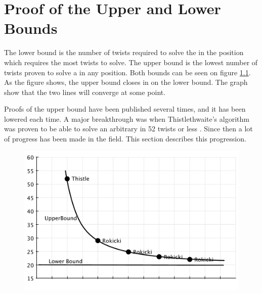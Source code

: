\chapter{Proof of the Upper and Lower Bounds}

The lower bound is the number of twists required to solve the \rubik{} in the position which requires the most twists to solve.
The upper bound is the lowest number of twists proven to solve a \rubik{} in any position.
Both bounds can be seen on figure \ref{fig:upperLowerBound}.
As the figure shows, the upper bound closes in on the lower bound.
The graph show that the two lines will converge at some point.

Proofs of the upper bound have been published several times, and it has been lowered each time.
A major breakthrough was when Thistlethwaite's algorithm was proven to be able to solve an arbitrary \rubik{} in 52 twists or less \cite{jaapthistle}.
Since then a lot of progress has been made in the field.
This section describes this progression.

\begin{figure}[ht]
	\centering
		\includegraphics[scale = 0.7]{input/pics/bounds.pdf}
	\caption{}
	\label{fig:upperLowerBound}
\end{figure}





